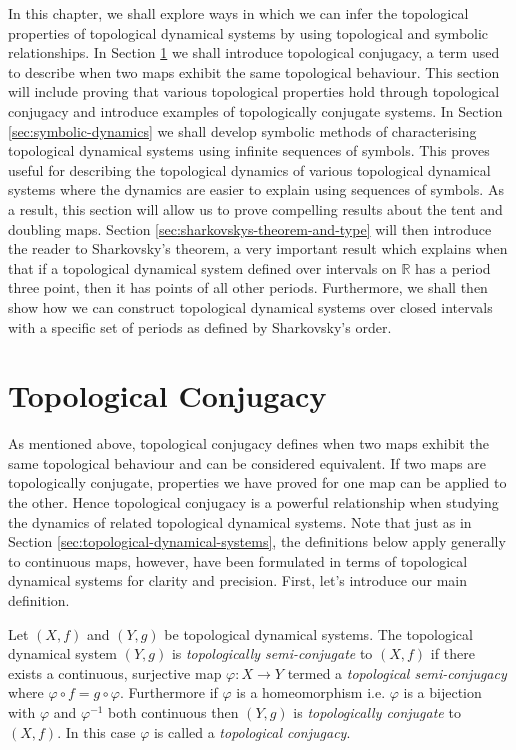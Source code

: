 In this chapter, we shall explore ways in which we can infer the topological properties of topological dynamical systems by using topological and symbolic relationships. In Section \ref{sec:topological-conjugacy} we shall introduce topological conjugacy, a term used to describe when two maps exhibit the same topological behaviour. This section will include proving that various topological properties hold through topological conjugacy and introduce examples of topologically conjugate systems. In Section \ref{sec:symbolic-dynamics} we shall develop symbolic methods of characterising topological dynamical systems using infinite sequences of symbols. This proves useful for describing the topological dynamics of various topological dynamical systems where the dynamics are easier to explain using sequences of symbols. As a result, this section will allow us to prove compelling results about the tent and doubling maps. Section \ref{sec:sharkovskys-theorem-and-type} will then introduce the reader to Sharkovsky's theorem, a very important result which explains when that if a topological dynamical system  defined over intervals on $\mathbb{R}$ has a period three point, then it has points of all other periods. Furthermore, we shall then show how we can construct topological dynamical systems over closed intervals with a specific set of periods as defined by Sharkovsky's order.

\section{Topological Conjugacy} \label{sec:topological-conjugacy}
As mentioned above, topological conjugacy defines when two maps exhibit the same topological behaviour and can be considered equivalent. If two maps are topologically conjugate, properties we have proved for one map can be applied to the other. Hence topological conjugacy is a powerful relationship when studying the dynamics of related topological dynamical systems. Note that just as in Section \ref{sec:topological-dynamical-systems}, the definitions below apply generally to continuous maps, however, have been formulated in terms of topological dynamical systems for clarity and precision. First, let's introduce our main definition.

\begin{defn} \label{defn:topological-conjugacy}
    Let $(X, f)$ and $(Y, g)$ be topological dynamical systems. The topological dynamical system $(Y, g)$ is \emph{topologically semi-conjugate} to $(X, f)$ if there exists a continuous, surjective map $\varphi: X \to Y$ termed a \emph{topological semi-conjugacy} where $\varphi \circ f = g \circ \varphi$. Furthermore if $\varphi$ is a homeomorphism i.e. $\varphi$ is a bijection with $\varphi$ and $\varphi^{-1}$ both continuous then $(Y, g)$ is \emph{topologically conjugate} to $(X, f)$. In this case $\varphi$ is called a \emph{topological conjugacy}.
\end{defn}

